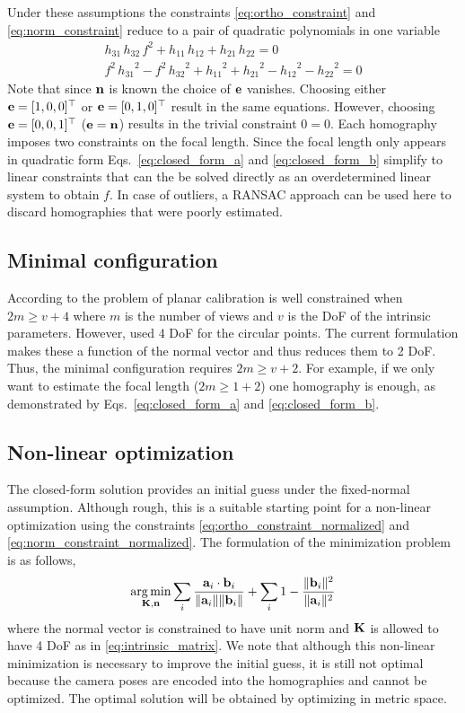 \documentclass[10pt,twocolumn,letterpaper]{article}
\begin{document}
Under these assumptions the constraints \eqref{eq:ortho_constraint} and \eqref{eq:norm_constraint} reduce to a pair of quadratic polynomials in one variable 
\begin{align}
h_{31}\, h_{32}\, f^2 + h_{11}\, h_{12} + h_{21}\, h_{22}=0
\label{eq:closed_form_a}
\\
f^2\, {h_{31}}^2 - f^2\, {h_{32}}^2 + {h_{11}}^2 + {h_{21}}^2 - {h_{12}}^2 - {h_{22}}^2=0
\label{eq:closed_form_b}
\end{align}
Note that since $\mathbf{n}$ is known the choice of $\mathbf{e}$ vanishes. Choosing either $\mathbf{e}=[1,0,0]^\top$ or $\mathbf{e}=[0,1,0]^\top$ result in the same equations. However, choosing $\mathbf{e}=[0,0,1]^\top$ (\ie $\mathbf{e}=\mathbf{n}$) results in the trivial constraint $0=0$. Each homography imposes two constraints on the focal length. Since the focal length only appears in quadratic form Eqs.~\eqref{eq:closed_form_a} and \eqref{eq:closed_form_b} simplify to linear constraints that can the be solved directly as an overdetermined linear system to obtain $f$. In case of outliers, a RANSAC approach can be used here to discard homographies that were poorly estimated.

\subsection{Minimal configuration}

According to \cite{hartley2003} the problem of planar calibration is well constrained when $2m \geq v+4$ where $m$ is the number of views and $v$ is the DoF of the intrinsic parameters. However, \cite{hartley2003} used 4 DoF for the circular points. The current formulation makes these a function of the normal vector and thus reduces them to 2 DoF. Thus, the minimal configuration requires $2m \geq v+2$. For example, if we only want to estimate the focal length ($2m \geq 1+2$) one homography is enough, as demonstrated by Eqs.~\eqref{eq:closed_form_a} and \eqref{eq:closed_form_b}.

\subsection{Non-linear optimization}

The closed-form solution provides an initial guess under the fixed-normal assumption. Although rough, this is a suitable starting point for a non-linear optimization using the constraints \eqref{eq:ortho_constraint_normalized} and \eqref{eq:norm_constraint_normalized}. The formulation of the minimization problem is as follows, 
%
\begin{align}
\operatorname*{arg\,min}_{\mathbf{K},\mathbf{n}} 
\sum_i 
\frac{\mathbf{a}_i \cdot \mathbf{b}_i}{\lVert\mathbf{a}_i\rVert \lVert\mathbf{b}_i\rVert} +
\sum_i 
1 - \frac{\lVert\mathbf{b}_i\rVert^2}{\lVert\mathbf{a}_i\rVert^2}
\label{eq:calib_ba}
\end{align}
%
where the normal vector is constrained to have unit norm and $\mathbf{K}$ is allowed to have 4 DoF as in \eqref{eq:intrinsic_matrix}. We note that although this non-linear minimization is necessary to improve the initial guess, it is still not optimal because the camera poses are encoded into the homographies and cannot be optimized. The optimal solution will be obtained by optimizing in metric space.
\end{document}
